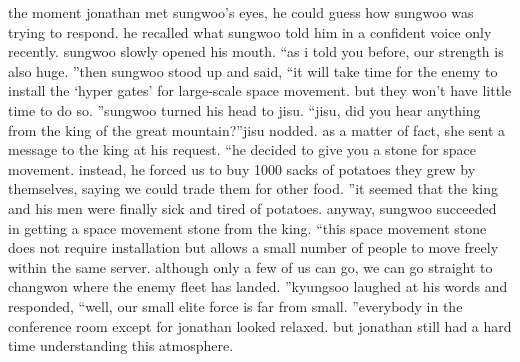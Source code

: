 the moment jonathan met sungwoo’s eyes, he could guess how sungwoo was trying to respond.
 he recalled what sungwoo told him in a confident voice only recently.
sungwoo slowly opened his mouth.
“as i told you before, our strength is also huge.
”then sungwoo stood up and said, “it will take time for the enemy to install the ‘hyper gates’ for large-scale space movement.
 but they won’t have little time to do so.
”sungwoo turned his head to jisu.
“jisu, did you hear anything from the king of the great mountain?”jisu nodded.
 as a matter of fact, she sent a message to the king at his request.
“he decided to give you a stone for space movement.
 instead, he forced us to buy 1000 sacks of potatoes they grew by themselves, saying we could trade them for other food.
”it seemed that the king and his men were finally sick and tired of potatoes.
anyway, sungwoo succeeded in getting a space movement stone from the king.
“this space movement stone does not require installation but allows a small number of people to move freely within the same server.
 although only a few of us can go, we can go straight to changwon where the enemy fleet has landed.
”kyungsoo laughed at his words and responded, “well, our small elite force is far from small.
”everybody in the conference room except for jonathan looked relaxed.
but jonathan still had a hard time understanding this atmosphere.


 